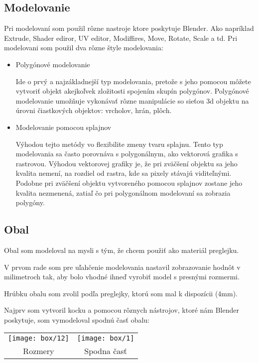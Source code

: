     \subsection{Modelovanie}
      Pri modelovaní som použil rôzne nastroje ktore poskytuje Blender. Ako napríklad Extrude, Shader ediror, UV editor, Modiffires, Move, Rotate, Scale a td. Pri modelovani som použil dva rôzne štyle modelovania:
      \begin{itemize}
        \item{
            Polygónové modelovanie

            Ide o prvý a najzákladnejší typ modelovania, pretože s jeho pomocou môžete vytvoriť objekt akejkoľvek zložitosti spojením skupín polygónov.
            Polygónové modelovanie umožňuje vykonávať rôzne manipulácie so sieťou 3d objektu na úrovni čiastkových objektov: vrcholov, hrán, plôch.
        }
        \item{
            Modelovanie pomocou splajnov

            Výhodou tejto metódy vo flexibilite zmeny tvaru splajnu.
            Tento typ modelovania sa často porovnáva s polygonálnym, ako vektorová grafika s rastrovou. Výhodou vektorovej grafiky je, že pri zväčšení objektu sa jeho kvalita nemení, na rozdiel od rastra, kde sa pixely stávajú viditeľnými. Podobne pri zväčšení objektu vytvoreného pomocou splajnov zostane jeho kvalita nezmenená, zatiaľ čo pri polygonálnom modelovaní sa zobrazia polygóny.
        }
      \end{itemize}

      \subsection{Obal}
        Obal som modeloval na mysli s tým, že chcem použiť ako materiál preglejku.

        V prvom rade som pre uľahčenie modelovania nastavil zobrazovanie hodnôt v milimetroch tak, aby bolo vhodné ihneď vyrobiť model s presnými rozmermi.

        Hrúbku obalu som zvolil podľa preglejky, ktorú som mal k dispozícii (4mm).

        Najprv som vytvoril kocku a pomocou rôznych nástrojov, ktoré nám Blender poskytuje, som vymodeloval spodnú časť obalu:

        \begin{tabular}{c c}
          \texttt{[image: box/12]} &  \texttt{[image: box/1]} \\
          Rozmery & Spodna časť \\
        \end{tabular}

